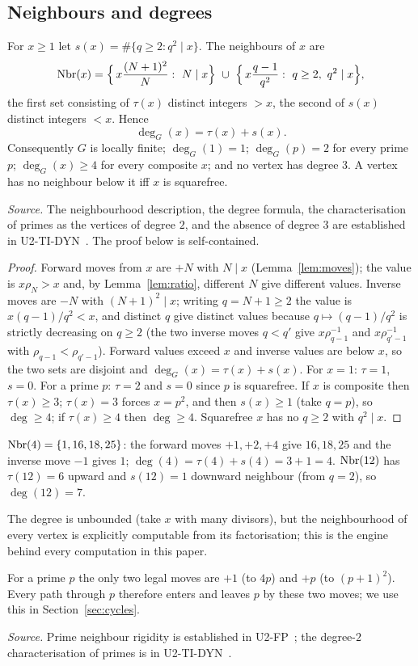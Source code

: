 \subsection{Neighbours and degrees}
\begin{theorem}\label{thm:degree}
For $x\ge1$ let $s(x)=\#\{q\ge2:q^2\mid x\}$. The neighbours of $x$ are
\[
\Nbr(x)=\Bigl\{\,x\frac{(N+1)^2}{N}:\ N\mid x\Bigr\}\ \cup\ \Bigl\{\,x\frac{q-1}{q^2}:\ q\ge2,\ q^2\mid x\Bigr\},
\]
the first set consisting of $\tau(x)$ distinct integers $>x$, the second of $s(x)$ distinct integers $<x$. Hence
\[
\deg_G(x)=\tau(x)+s(x).
\]
Consequently $G$ is locally finite; $\deg_G(1)=1$; $\deg_G(p)=2$ for every prime $p$; $\deg_G(x)\ge4$ for every composite $x$; and no vertex has degree $3$. A vertex has no neighbour below it iff $x$ is squarefree.
\end{theorem}
\noindent\emph{Source.} The neighbourhood description, the degree formula, the characterisation of primes as the vertices of degree $2$, and the absence of degree $3$ are established in U2-TI-DYN~\cite{u2tidyn}. The proof below is self-contained.
\begin{proof}
Forward moves from $x$ are $+N$ with $N\mid x$ (Lemma~\ref{lem:moves}); the value is $x\rho_N>x$ and, by Lemma~\ref{lem:ratio}, different $N$ give different values. Inverse moves are $-N$ with $(N+1)^2\mid x$; writing $q=N+1\ge2$ the value is $x(q-1)/q^2<x$, and distinct $q$ give distinct values because $q\mapsto(q-1)/q^2$ is strictly decreasing on $q\ge2$ (the two inverse moves $q<q'$ give $x\rho_{q-1}^{-1}$ and $x\rho_{q'-1}^{-1}$ with $\rho_{q-1}<\rho_{q'-1}$). Forward values exceed $x$ and inverse values are below $x$, so the two sets are disjoint and $\deg_G(x)=\tau(x)+s(x)$.
For $x=1$: $\tau=1$, $s=0$. For a prime $p$: $\tau=2$ and $s=0$ since $p$ is squarefree. If $x$ is composite then $\tau(x)\ge3$; $\tau(x)=3$ forces $x=p^2$, and then $s(x)\ge1$ (take $q=p$), so $\deg\ge4$; if $\tau(x)\ge4$ then $\deg\ge4$. Squarefree $x$ has no $q\ge2$ with $q^2\mid x$.
\end{proof}
\begin{example} $\operatorname{Nbr}(4)=\{1,16,18,25\}$: the forward moves $+1,+2,+4$ give $16,18,25$ and the inverse move $-1$ gives $1$; $\deg(4)=\tau(4)+s(4)=3+1=4$. $\operatorname{Nbr}(12)$ has $\tau(12)=6$ upward and $s(12)=1$ downward neighbour (from $q=2$), so $\deg(12)=7$.
\end{example}
The degree is unbounded (take $x$ with many divisors), but the neighbourhood of every vertex is explicitly computable from its factorisation; this is the engine behind every computation in this paper.
\begin{remark}\label{rem:primerigid}
For a prime $p$ the only two legal moves are $+1$ (to $4p$) and $+p$ (to $(p+1)^2$). Every path through $p$ therefore enters and leaves $p$ by these two moves; we use this in Section~\ref{sec:cycles}.
\end{remark}
\noindent\emph{Source.} Prime neighbour rigidity is established in U2-FP~\cite{u2fp}; the degree-$2$ characterisation of primes is in U2-TI-DYN~\cite{u2tidyn}.

